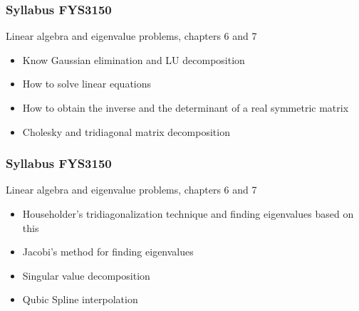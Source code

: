 \documentclass{beamer}
\begin{document}
\begin{frame}
\frametitle{Syllabus FYS3150}

\begin{block}{Linear algebra and eigenvalue problems, chapters 6 and 7 }
\begin{itemize}
  \item Know Gaussian elimination and LU decomposition

  \item How to solve linear equations

  \item How to obtain the inverse and the determinant of a real symmetric matrix

  \item Cholesky and tridiagonal matrix decomposition
\end{itemize}

\noindent
\end{block}
\end{frame}

\begin{frame}
\frametitle{Syllabus FYS3150}

\begin{block}{Linear algebra and eigenvalue problems, chapters 6 and 7 }
\begin{itemize}
  \item Householder's tridiagonalization technique and finding eigenvalues based on this

  \item Jacobi's method for finding eigenvalues

  \item Singular value decomposition

  \item Qubic Spline interpolation
\end{itemize}

\noindent
\end{block}
\end{frame}
\end{document}
